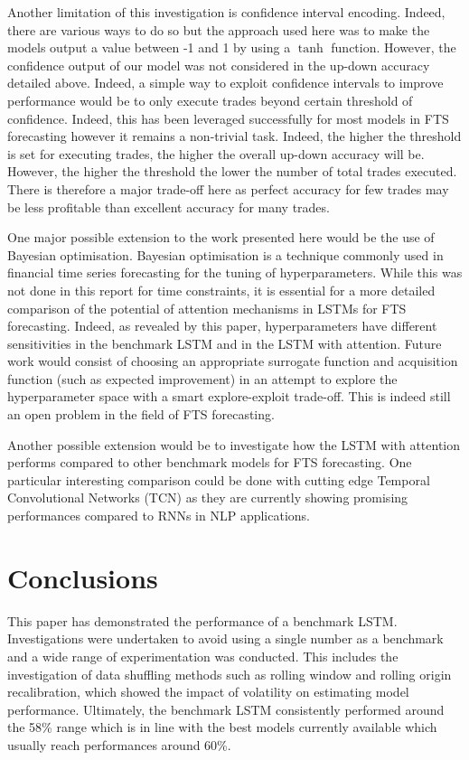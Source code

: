 \documentclass{article}
\begin{document}
Another limitation of this investigation is confidence interval encoding. Indeed, there are various ways to do so but the approach used here was to make the models output a value between -1 and 1 by using a $\tanh$ function. However, the confidence output of our model was not considered in the up-down accuracy detailed above. Indeed, a simple way to exploit confidence intervals to improve performance would be to only execute trades beyond certain threshold of confidence. Indeed, this has been leveraged successfully for most models in FTS forecasting however it remains a non-trivial task. Indeed, the higher the threshold is set for executing trades, the higher the overall up-down accuracy will be. However, the higher the threshold the lower the number of total trades executed. There is therefore a major trade-off here as perfect accuracy for few trades may be less profitable than excellent accuracy for many trades.  

One major possible extension to the work presented here would be the use of Bayesian optimisation. Bayesian optimisation is a technique commonly used in financial time series forecasting for the tuning of hyperparameters. While this was not done in this report for time constraints, it is essential for a more detailed comparison of the potential of attention mechanisms in LSTMs for FTS forecasting. Indeed, as revealed by this paper, hyperparameters have different sensitivities in the benchmark LSTM and in the LSTM with attention. Future work would consist of choosing an appropriate surrogate function and acquisition function (such as expected improvement) in an attempt to explore the hyperparameter space with a smart explore-exploit trade-off. This is indeed still an open problem in the field of FTS forecasting.

Another possible extension would be to investigate how the LSTM with attention performs compared to other benchmark models for FTS forecasting. One particular interesting comparison could be done with cutting edge Temporal Convolutional Networks (TCN) as they are currently showing promising performances compared to RNNs in NLP applications.

\section{Conclusions}

This paper has demonstrated the performance of a benchmark LSTM. Investigations were undertaken to avoid using a single number as a benchmark and a wide range of experimentation was conducted. This includes the investigation of data shuffling methods such as rolling window and rolling origin recalibration, which showed the impact of volatility on estimating model performance. Ultimately, the benchmark LSTM consistently performed around the 58\% range which is in line with the best models currently available which usually reach performances around 60\%. 
\end{document}
